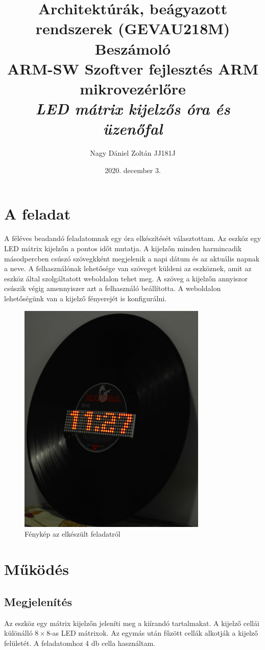 \documentclass[a4paper, 12pt]{article}
\title{Architektúrák, beágyazott rendszerek (GEVAU218M)\\\LARGE{\textbf{Beszámoló}}\\ \medskip \large{\textbf{ARM-SW} Szoftver fejlesztés ARM mikrovezérlőre} \\ \bigskip \LARGE{\textit{LED mátrix kijelzős óra és üzenőfal}}}
\date{2020. december 3.}
\author{Nagy Dániel Zoltán JJ181J}
\begin{document}
\maketitle

\section{A feladat}
A féléves beadandó feladatomnak egy óra elkészítését választottam.
Az eszköz egy LED mátrix kijelzőn a pontos időt mutatja. A kijelzőn minden harmincadik másodpercben csúszó szövegkként megjelenik a napi dátum és az aktuális napnak a neve. A felhasználónak lehetősége van szöveget küldeni az eszköznek, amit az eszköz által szolgáltatott weboldalon tehet meg. A szöveg a kijelzőn annyiszor csúszik végig amennyiszer azt a felhasználó beállította. A weboldalon lehetőségünk van a kijelző fényerejét is konfigurálni.

\begin{figure}[ht]
	\centering
	\includegraphics[width = 9cm]{images/vinyl_clock.JPG}
	\caption{Fénykép az elkészült feladatról}
	\label{fig:product}
\end{figure}	

\section{Működés}

\subsection{Megjelenítés}
Az eszköz egy mátrix kijelzőn jeleníti meg a kiírandó tartalmakat. A kijelző cellái különálló $8\times 8$-as LED mátrixok. Az egymás után fűzött cellák alkotják a kijelző felületét. A feladatomhoz 4 db cella használtam.
\end{document}
